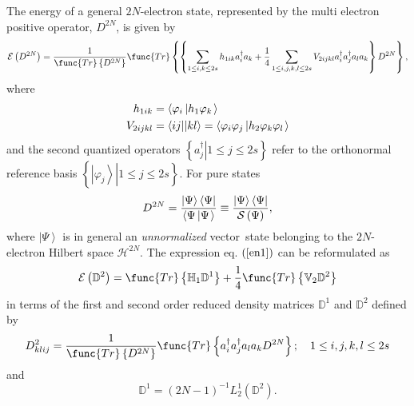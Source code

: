 \documentclass{preprint}
\begin{document}
The energy of a general $2N$-electron state, represented by the multi
electron positive operator, $D^{2N}$, is given by
\begin{equation}
\mathcal{E}\left( D^{2N}\right) =\frac{1}{\func{Tr}\left\{ D^{2N}\right\} }%
\func{Tr}\left\{ \left\{ \sum_{1\leq i,k\leq 2s}h_{1ik}a_{i}^{\dagger }a_{k}+%
\frac{1}{4}\sum_{1\leq i,j,k,l\leq 2s}V_{2ijkl}a_{i}^{\dagger
}a_{j}^{\dagger }a_{l}a_{k}\right\} D^{2N}\right\} ,  \label{en1}
\end{equation}%
where
\begin{align}
h_{1ik}& =\left\langle \varphi _{i}\left\vert h_{1}\varphi _{k}\right.
\right\rangle  \notag \\
V_{2ijkl}& =\left\langle ij||kl\right\rangle =\left\langle \varphi
_{i}\varphi _{j}\left\vert h_{2}\varphi _{k}\varphi _{l}\right. \right\rangle
\end{align}%
and the second quantized operators $\left\{ \left. a_{j}^{\dagger
}\right\vert 1\leq j\leq 2s\right\} $ refer to the orthonormal reference
basis $\left\{ \left. \left\vert \varphi _{j}\right\rangle \right\vert 1\leq
j\leq 2s\right\} $. For pure states
\begin{equation}
D^{2N}=\frac{\left\vert \Psi \right\rangle \left\langle \Psi \right\vert }{%
\left\langle \Psi \left\vert \Psi \right. \right\rangle }\equiv \frac{%
\left\vert \Psi \right\rangle \left\langle \Psi \right\vert }{\mathcal{S}%
\left( \Psi \right) },
\end{equation}%
where $\left\vert \Psi \right\rangle $ is in general an \emph{unnormalized }%
vector\emph{\ }state belonging to the $2N$-electron Hilbert space $\mathcal{H%
}^{2N}.$ The expression eq. $\left( \ref{en1}\right) $ can be reformulated
as
\begin{equation}
\mathcal{E}\left( \mathbb{D}^{2}\right) =\func{Tr}\left\{ \mathbb{H}_{1}%
\mathbb{D}^{1}\right\} +\frac{1}{4}\func{Tr}\left\{ \mathbb{V}_{2}\mathbb{D}%
^{2}\right\}
\end{equation}%
in terms of the first and second order reduced density matrices $\mathbb{D}%
^{1}$ and $\mathbb{D}^{2}$ defined by
\begin{equation}
D_{klij}^{2}=\frac{1}{\func{Tr}\left\{ D^{2N}\right\} }\func{Tr}\left\{
a_{i}^{\dagger }a_{j}^{\dagger }a_{l}a_{k}D^{2N}\right\} ;\quad 1\leq
i,j,k,l\leq 2s
\end{equation}%
and
\begin{equation}
\mathbb{D}^{1}=\left( 2N-1\right) ^{-1}L_{2}^{1}\left( \mathbb{D}^{2}\right)
.
\end{equation}%
\end{document}
